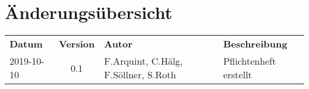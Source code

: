 \section*{Änderungsübersicht}
\begin{tabular}{lcll}
    \textbf{Datum} & \textbf{Version} & \textbf{Autor} & \textbf{Beschreibung}\\
    2019-10-10 & 0.1 & F.Arquint, C.Hälg, F.Söllner, S.Roth& Pflichtenheft erstellt \\
\end{tabular}

